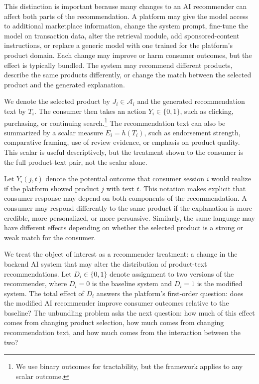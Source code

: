 \documentclass[11pt]{article}
\newcommand{\J}{J}
\newcommand{\Y}{Y}
\newcommand{\catalog}{\mathcal{A}}
\begin{document}
This distinction is important because many changes to an AI recommender can affect both parts of the recommendation. A platform may give the model access to additional marketplace information, change the system prompt, fine-tune the model on transaction data, alter the retrieval module, add sponsored-content instructions, or replace a generic model with one trained for the platform's product domain. Each change may improve or harm consumer outcomes, but the effect is typically bundled. The system may recommend different products, describe the same products differently, or change the match between the selected product and the generated explanation.

We denote the selected product by $\J_i \in \catalog_i$ and the generated recommendation text by $T_i$. The consumer then takes an action $\Y_i \in \{0,1\}$, such as clicking, purchasing, or continuing search.\footnote{We use binary outcomes for tractability, but the framework applies to any scalar outcome.} The recommendation text can also be summarized by a scalar measure $E_i = h(T_i)$, such as endorsement strength, comparative framing, use of review evidence, or emphasis on product quality. This scalar is useful descriptively, but the treatment shown to the consumer is the full product-text pair, not the scalar alone.

Let $\Y_i(j,t)$ denote the potential outcome that consumer session $i$ would realize if the platform showed product $j$ with text $t$. This notation makes explicit that consumer response may depend on both components of the recommendation. A consumer may respond differently to the same product if the explanation is more credible, more personalized, or more persuasive. Similarly, the same language may have different effects depending on whether the selected product is a strong or weak match for the consumer.

We treat the object of interest as a recommender treatment: a change in the backend AI system that may alter the distribution of product-text recommendations. Let $D_i \in \{0,1\}$ denote assignment to two versions of the recommender, where $D_i = 0$ is the baseline system and $D_i = 1$ is the modified system. The total effect of $D_i$ answers the platform's first-order question: does the modified AI recommender improve consumer outcomes relative to the baseline? The unbundling problem asks the next question: how much of this effect comes from changing product selection, how much comes from changing recommendation text, and how much comes from the interaction between the two?
\end{document}
